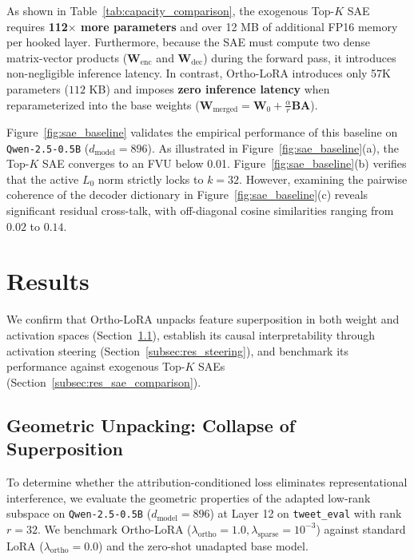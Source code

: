 \documentclass[10pt,twocolumn,letterpaper]{article}
\begin{document}
As shown in Table~\ref{tab:capacity_comparison}, the exogenous Top-$K$ SAE requires \textbf{112$\times$ more parameters} and over 12 MB of additional FP16 memory per hooked layer. Furthermore, because the SAE must compute two dense matrix-vector products ($\bm{W}_{\text{enc}}$ and $\bm{W}_{\text{dec}}$) during the forward pass, it introduces non-negligible inference latency. In contrast, Ortho-LoRA introduces only 57K parameters ($112$ KB) and imposes \textbf{zero inference latency} when reparameterized into the base weights ($\bm{W}_{\text{merged}} = \bm{W}_0 + \frac{\alpha}{r}\bm{B}\bm{A}$).

Figure~\ref{fig:sae_baseline} validates the empirical performance of this baseline on \texttt{Qwen-2.5-0.5B} ($d_{\text{model}} = 896$). As illustrated in Figure~\ref{fig:sae_baseline}(a), the Top-$K$ SAE converges to an FVU below 0.01. Figure~\ref{fig:sae_baseline}(b) verifies that the active $L_0$ norm strictly locks to $k=32$. However, examining the pairwise coherence of the decoder dictionary in Figure~\ref{fig:sae_baseline}(c) reveals significant residual cross-talk, with off-diagonal cosine similarities ranging from $0.02$ to $0.14$.

\section{Results}
\label{sec:results}

We confirm that Ortho-LoRA unpacks feature superposition in both weight and activation spaces (Section~\ref{subsec:res_geometric_unpacking}), establish its causal interpretability through activation steering (Section~\ref{subsec:res_steering}), and benchmark its performance against exogenous Top-$K$ SAEs (Section~\ref{subsec:res_sae_comparison}).

\subsection{Geometric Unpacking: Collapse of Superposition}
\label{subsec:res_geometric_unpacking}

To determine whether the attribution-conditioned loss eliminates representational interference, we evaluate the geometric properties of the adapted low-rank subspace on \texttt{Qwen-2.5-0.5B} ($d_{\text{model}} = 896$) at Layer 12 on \texttt{tweet\_eval} with rank $r=32$. We benchmark Ortho-LoRA ($\lambda_{\text{ortho}}=1.0, \lambda_{\text{sparse}}=10^{-3}$) against standard LoRA ($\lambda_{\text{ortho}}=0.0$) and the zero-shot unadapted base model.
\end{document}
